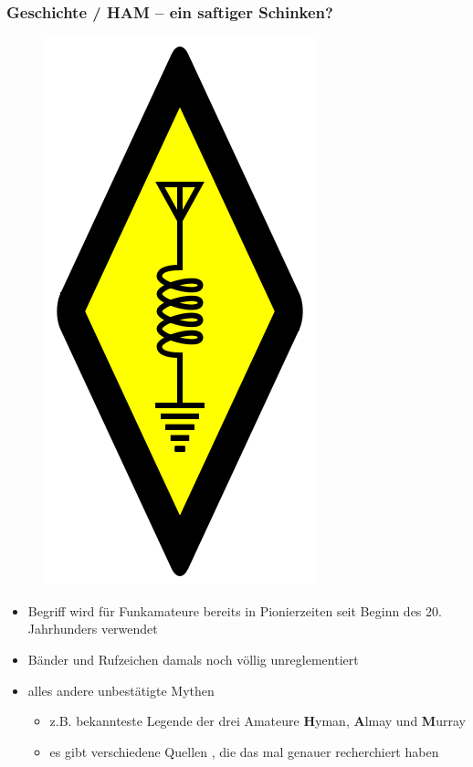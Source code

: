 \begin{frame}
  \frametitle{Geschichte / HAM -- ein saftiger Schinken?}

  \begin{center}
    \begin{figure}
      \includegraphics[height=0.3\textheight,width=.5\textwidth,keepaspectratio]{bv01/International_amateur_radio_symbol.png}
    \end{figure}
  \end{center}

  \begin{itemize}
    \item Begriff wird für Funkamateure bereits in Pionierzeiten seit Beginn
      des 20.\,Jahrhunders verwendet
    \item Bänder und Rufzeichen damals noch völlig unreglementiert
    \item alles andere unbestätigte Mythen
      \begin{itemize}
        \item z.B. bekannteste Legende der drei Amateure \textbf{H}yman,
          \textbf{A}lmay und \textbf{M}urray
        \item es gibt verschiedene Quellen \hyperlink{refs}{\cite{ham}},
          die das mal genauer recherchiert haben
      \end{itemize}
  \end{itemize}

\end{frame}

